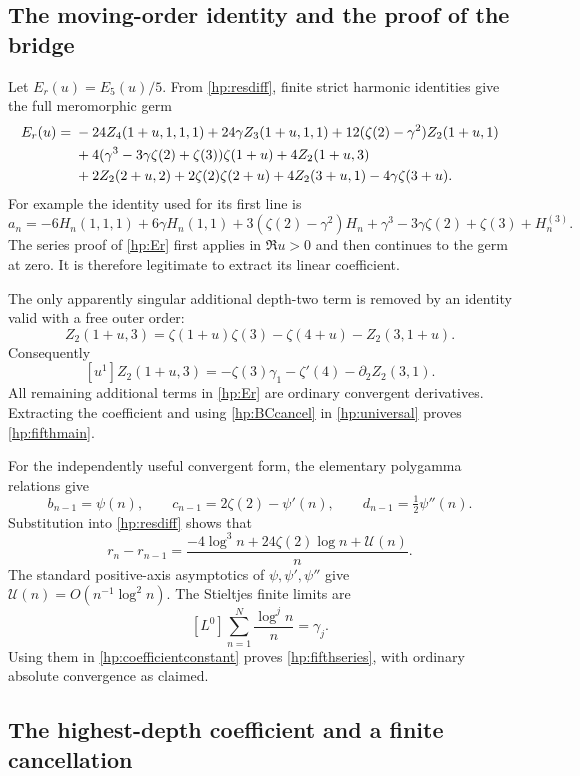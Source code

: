 \subsection{The moving-order identity and the proof of the bridge}

Let $E_r(u)=E_5(u)/5$. From \eqref{hp:resdiff}, finite strict
harmonic identities give the full meromorphic germ
\begin{align}\label{hp:Er}
 E_r(u)={}&-24Z_4(1+u,1,1,1)+24\gamma Z_3(1+u,1,1)
         +12(\zeta(2)-\gamma^2)Z_2(1+u,1)\notag\\
 &+4(\gamma^3-3\gamma\zeta(2)+\zeta(3))\zeta(1+u)
       +4Z_2(1+u,3)\notag\\
 &+2Z_2(2+u,2)+2\zeta(2)\zeta(2+u)
                    +4Z_2(3+u,1)-4\gamma\zeta(3+u).
\end{align}
For example the identity used for its first line is
\[
 a_n=-6H_n(1,1,1)+6\gamma H_n(1,1)
       +3(\zeta(2)-\gamma^2)H_n
       +\gamma^3-3\gamma\zeta(2)+\zeta(3)+H_n^{(3)}.
\]
The series proof of \eqref{hp:Er} first applies in $\Re u>0$ and
then continues to the germ at zero. It is therefore legitimate to
extract its linear coefficient.

The only apparently singular additional depth-two term is removed
by an identity valid with a free outer order:
\[
 Z_2(1+u,3)=\zeta(1+u)\zeta(3)-\zeta(4+u)-Z_2(3,1+u).
\]
Consequently
\[
 [u^1]Z_2(1+u,3)
       =-\zeta(3)\gamma_1-\zeta'(4)-\partial_2Z_2(3,1).
\]
All remaining additional terms in \eqref{hp:Er} are ordinary
convergent derivatives. Extracting the coefficient and using
\eqref{hp:BCcancel} in \eqref{hp:universal} proves
\eqref{hp:fifthmain}.

For the independently useful convergent form, the elementary
polygamma relations give
\[
 b_{n-1}=\psi(n),\qquad c_{n-1}=2\zeta(2)-\psi'(n),\qquad
 d_{n-1}=\tfrac12\psi''(n).
\]
Substitution into \eqref{hp:resdiff} shows that
\[
 r_n-r_{n-1}
   =\frac{-4\log^3n+24\zeta(2)\log n+\mathcal U(n)}n.
\]
The standard positive-axis asymptotics of $\psi,\psi',\psi''$
give $\mathcal U(n)=O(n^{-1}\log^2 n)$.
The Stieltjes finite limits are
\[
 [L^0]\sum_{n=1}^N\frac{\log^j n}{n}=\gamma_j.
\]
Using them in \eqref{hp:coefficientconstant} proves
\eqref{hp:fifthseries}, with ordinary absolute convergence as
claimed.

\subsection{The highest-depth coefficient and a finite cancellation}

